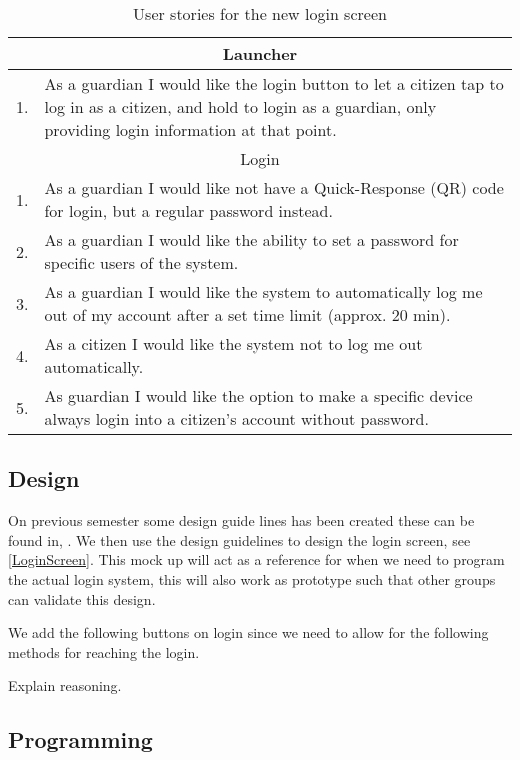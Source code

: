 \begin{table}[H]
\begin{tabular}{|c|p{12.5cm}|}
\hline 
\multicolumn{2}{|c|}{Launcher}\\
\hline
1. & As a guardian I would like the login button to let a citizen tap to log in
as a citizen, and hold to login as a guardian, only providing login information
at that point. \\ \hline
\multicolumn{2}{|c|}{Login}\\ \hline
1. & As a guardian I would like not have a Quick-Response (QR) code for login,
but a regular password instead.\\ \hline
2. & As a guardian I would like the ability to set a password for specific users
of the system.\\ \hline
3. & As a guardian I would like the system to automatically log me out of my
account after a set time limit (approx. 20 min).\\ \hline
4. & As a citizen I would like the system not to log me out automatically.\\ \hline
5. & As guardian I would like the option to make a specific device always login
into a citizen's account without password.\\ \hline
\end{tabular}
\caption{User stories for the new login screen}
\label{UserStoriesLogin}
\end{table}

\subsection{Design}

On previous semester some design guide lines has been created these can be
found in, . We then use the design
guidelines to design the login screen, see \autoref{LoginScreen}. This mock up
will act as a reference for when we need to program the actual login system,
this will also work as prototype such that other groups can validate this
design. 

We add the following buttons on login since we need to allow for the
following methods for reaching the login.


Explain reasoning.

\subsection{Programming}




